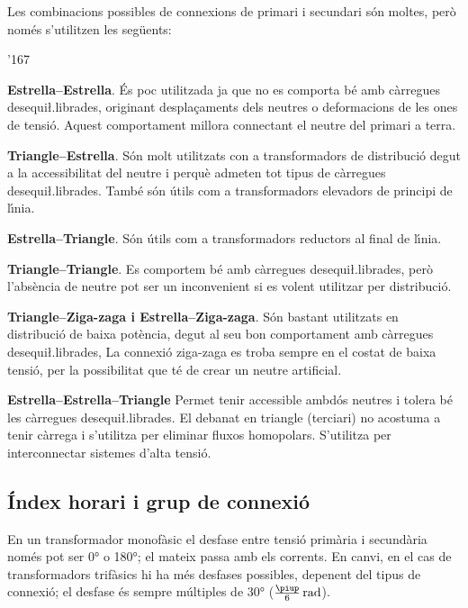 Les combinacions possibles de connexions de primari i secundari s\'{o}n moltes, per\`{o} nom\'{e}s s'utilitzen les seg\"{u}ents:
\begin{dinglist}{'167}
   \item \textbf{Estrella--Estrella}. \'{E}s poc utilitzada ja que no es comporta b\'{e} amb c\`{a}rregues desequi{\l.l}ibrades, originant despla\c{c}aments dels neutres o deformacions de les ones de tensi\'{o}. Aquest comportament millora connectant el neutre del primari a terra.
   \item \textbf{Triangle--Estrella}. S\'{o}n molt utilitzats con a transformadors de distribuci\'{o} degut a la accessibilitat del neutre i perqu\`{e} admeten tot tipus de c\`{a}rregues desequi{\l.l}ibrades. Tamb\'{e} s\'{o}n \'{u}tils com a transformadors elevadors de principi de l\'{\i}nia.
   \item \textbf{Estrella--Triangle}. S\'{o}n \'{u}tils com a transformadors reductors al final de l\'{\i}nia.
   \item \textbf{Triangle--Triangle}. Es comportem b\'{e} amb c\`{a}rregues desequi{\l.l}ibrades, per\`{o} l'abs\`{e}ncia de neutre pot ser un inconvenient si es volent utilitzar per distribuci\'{o}.
   \item \textbf{Triangle--Ziga-zaga i Estrella--Ziga-zaga}. S\'{o}n bastant utilitzats en distribuci\'{o} de baixa pot\`{e}ncia, degut al seu bon comportament amb c\`{a}rregues desequi{\l.l}ibrades, La connexi\'{o} ziga-zaga es troba sempre en el costat de baixa tensi\'{o}, per la possibilitat que t\'{e} de crear un neutre artificial.
   \item \textbf{Estrella--Estrella--Triangle} Permet tenir accessible ambd\'{o}s  neutres i tolera  b\'{e} les c\`{a}rregues  desequi{\l.l}ibrades. El debanat en triangle (terciari) no acostuma a tenir c\`{a}rrega i s'utilitza per eliminar fluxos homopolars. S'utilitza per interconnectar sistemes d'alta tensi\'{o}.
\end{dinglist}


\subsection{\'{I}ndex horari i grup de connexi\'{o}}\label{sec:connex-index-horari}

En un transformador monof\`{a}sic el desfase entre tensi\'{o} prim\`{a}ria i secund\`{a}ria nom\'{e}s pot ser \ang{0} o \ang{180}; el mateix passa amb els corrents. En canvi, en el cas de transformadors trif\`{a}sics hi ha m\'{e}s desfases possibles, depenent del tipus de connexi\'{o}; el desfase \'{e}s sempre m\'{u}ltiples de \ang{30} ($\frac{\piup}{6}\unit{rad}$).


